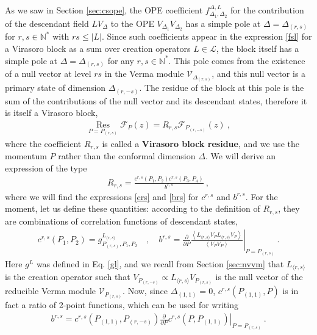 \documentclass[12pt, a4paper]{article}
\theoremstyle{break}
\begin{document}
As we saw in Section \ref{sec:csope}, 
the OPE coefficient $f^{\Delta, L}_{\Delta_1,\Delta_2}$ for the contribution of the descendant field $LV_\Delta$ to the OPE $V_{\Delta_1}V_{\Delta_2}$ 
has a simple pole at $\Delta=\Delta_{(r,s)}$ for $r,s\in\mathbb{N}^*$ with $rs\leq |L|$. 
Since such coefficients appear in the expression \eqref{fsl} for a Virasoro block as a sum over creation operators $L\in\mathcal{L}$, 
the block itself has a simple pole at $\Delta=\Delta_{(r,s)}$ for any $r,s\in\mathbb{N}^*$. This pole comes from the existence of a null vector at level $rs$ in the Verma module $\mathcal{V}_{\Delta_{(r,s)}}$, and this null vector is a primary state of dimension $\Delta_{(r,-s)}$. The residue of the block at this pole is the sum of the contributions of the null vector and its descendant states, therefore it is itself a Virasoro block,
\begin{align}
 \boxed{\underset{P=P_{(r,s)}}{\operatorname{Res}} \mathcal{F}_P(z) = R_{r,s}\mathcal{F}_{P_{(r,-s)}}(z)}\ ,
 \label{resf}
\end{align}
where the coefficient $R_{r,s}$ is called a \textbf{Virasoro block residue}, and we use the momentum $P$ rather than the conformal dimension $\Delta$. We will derive an expression of the type 
\begin{align}
R_{r,s} = \frac{c^{r,s}(P_1,P_2)c^{r,s}(P_3,P_4)}{b^{r,s}}\ , 
 \label{rrs}
\end{align}
where we will find the expressions \eqref{crs} and \eqref{brs} for $c^{r,s}$ and $b^{r,s}$.
For the moment, let us define these quantities: according to the definition of $R_{r,s}$, they are combinations of correlation functions of descendant states, 
\begin{align}
 c^{r,s}(P_1,P_2) = g^{L_{\langle r,s\rangle}}_{P_{(r,s)},P_1,P_2} \quad , \quad b^{r,s} =\left.\frac{\partial}{\partial P} \frac{\left<L_{\langle r,s\rangle} V_P L_{\langle r,s\rangle} V_P \right>}{\left<V_PV_P\right>}\right|_{P=P_{(r,s)}}\ . 
\end{align}
Here $g^L$ was defined in Eq. \eqref{gl}, and we recall from Section \ref{sec:nvvm} that $L_{\langle r,s\rangle}$ is the creation operator such that $V_{P_{(r,-s)}}\propto L_{\langle r,s\rangle}V_{P_{(r,s)}}$ is the null vector of the reducible Verma module $\mathcal{V}_{P_{(r,s)}}$. Now, since $\Delta_{(1,1)}=0$, $c^{r,s}(P_{(1,1)},P)$ is in fact a ratio of 2-point functions, which can be used for writing 
\begin{align}
 b^{r,s} = c^{r,s}\left(P_{(1,1)}, P_{(r,-s)}\right)  \left.\frac{\partial}{\partial P} c^{r,s}\left(P,P_{(1,1)}\right)\right|_{P=P_{(r,s)}}\ . 
 \label{bcdc}
\end{align}
\end{document}
